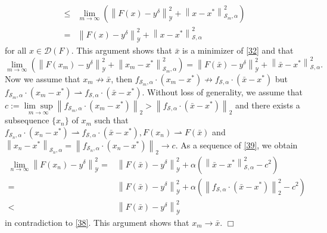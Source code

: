 \documentclass[10pt,a4paper]{amsart}
\newenvironment{proof}{{\em Proof.}}{$\Box$}
\begin{document}
\begin{proof}
\begin{displaymath}
\begin{aligned}
\leq
&\lim_{m\to\infty}\left(\left\|F(x) - y^\delta\right\|^2_\mathcal{Y} + \left\|x - x^*\right\|_{\mathcal{S}_m, \alpha}^2\right)\\
=
&\left\|F(x) - y^\delta\right\|^2_\mathcal{Y} + \left\|x - x^*\right\|_{\mathcal{S}, \alpha}^2
\end{aligned}
\end{displaymath}
for all $ x\in \mathcal{D}(F) $. This argument shows that $\bar{x}$ is a minimizer of \eqref{32} and that
\begin{equation}\label{39}
\lim_{m\to\infty}\left(\left\|F(x_m) - y^\delta\right\|^2_\mathcal{Y} + \left\|x_m - x^*\right\|_{\mathcal{S}_m, \alpha}^2\right) = \left\|F(\bar{x}) - y^\delta\right\|^2_\mathcal{Y} + \left\|\bar{x} - x^*\right\|_{\mathcal{S}, \alpha}^2.
\end{equation}
Now we assume that $ x_m\not\to\bar{x} $, then $ f_{\mathcal{S}_m,\alpha}\cdot(x_m-x^*)\not\to f_{\mathcal{S},\alpha}\cdot(\bar{x}-x^*) $ but $ f_{\mathcal{S}_m,\alpha}\cdot(x_m-x^*)\rightharpoonup f_{\mathcal{S},\alpha}\cdot(\bar{x}-x^*) $.
Without loss of generality, we assume that $ c := \underset{m\to \infty}{\lim\sup}\left\|f_{\mathcal{S}_m,\alpha}\cdot(x_m-x^*)\right\|_2 > \left\|f_{\mathcal{S},\alpha}\cdot(\bar{x}-x^*)\right\|_2 $ and there exists a subsequence $ \{x_n\} $ of $ x_m $ such that $ f_{\mathcal{S}_n,\alpha}\cdot(x_n-x^*)\rightharpoonup f_{\mathcal{S},\alpha}\cdot(\bar{x}-x^*), F(x_n)\rightharpoonup F(\bar{x}) $ and $ \left\|x_n-x^*\right\|_{\mathcal{S}_n, \alpha} = \left\|f_{\mathcal{S}_n,\alpha}\cdot(x_n-x^*)\right\|_2\to c $. As a sequence of \eqref{39}, we obtain
\begin{equation*}\label{310}
\begin{aligned}
\lim_{n\to\infty}\left\|F(x_n) - y^\delta\right\|^2_\mathcal{Y} =
&\left\|F(\bar{x}) - y^\delta\right\|^2_\mathcal{Y} + \alpha\left(\left\|\bar{x} - x^*\right\|_{\mathcal{S}, \alpha}^2 - c^2\right)\\
=&\left\|F(\bar{x}) - y^\delta\right\|^2_\mathcal{Y} + \alpha\left(\left\|f_{\mathcal{S},\alpha}\cdot(\bar{x}-x^*)\right\|_2^2 - c^2\right)\\
<&\left\|F(\bar{x}) - y^\delta\right\|^2_\mathcal{Y}
\end{aligned}
\end{equation*}
in contradiction to \eqref{38}.
This argument shows that $ x_m\to \bar{x} $.
\end{proof}
\end{document}
